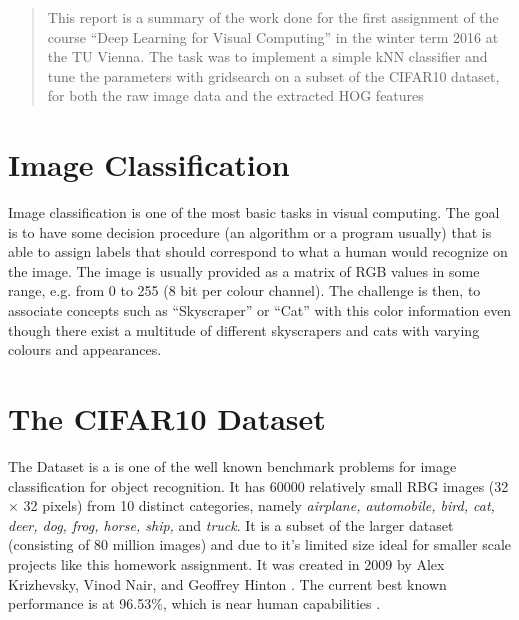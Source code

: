 \newcommand{\ttitle}{kNN Classification and Histograms of Oriented Gradients}
\hyphenation{}
\maketitle



\begin{abstract}
This report is a summary of the work done for the first assignment of the course ``Deep Learning for Visual Computing'' in the winter term 2016 at the TU Vienna. The task was to implement a simple kNN classifier and tune the parameters with gridsearch on a subset of the CIFAR10 dataset, for both the raw image data and the extracted HOG features
\end{abstract}



\section{Image Classification} %
Image classification is one of the most basic tasks in visual computing. The goal is to have some decision procedure (an algorithm or a program usually) that is able to assign labels that should correspond to what a human would recognize on the image. The image is usually provided as a matrix of RGB values in some range, e.g. from 0 to 255 (8 bit per colour channel). The challenge is then, to associate concepts such as ``Skyscraper'' or ``Cat'' with this color information even though there exist a multitude of different skyscrapers and cats with varying colours and appearances.

\section{The CIFAR10 Dataset} %
The  Dataset is a is one of the well known benchmark problems for image classification for object recognition. It has 60000 relatively small RBG images (32 $\times$ 32 pixels) from 10 distinct categories, namely \emph{airplane, automobile, bird, cat, deer, dog, frog, horse, ship,} and \emph{truck}. It is a subset of the larger  dataset (consisting of 80 million images) and due to it's limited size ideal for smaller scale projects like this homework assignment. It was created in 2009 by Alex Krizhevsky, Vinod Nair, and Geoffrey Hinton\cite{CIFAR10} \cite{Krizhevsky09learningmultiple}. The current best known performance is at 96.53\%, which is near human capabilities \cite{Graham14a}.


